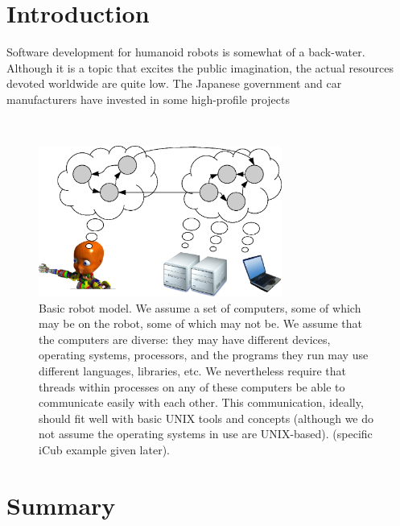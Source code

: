 
\section{Introduction}


Software development for humanoid robots is somewhat of a back-water.
Although it is a topic that excites the public imagination, the
actual resources devoted worldwide are quite low.  The Japanese
government and car manufacturers have invested in some high-profile
projects





\ \\
\newpage


\begin{figure}
\centerline{
\includegraphics[width=8cm]{fig-nethead}
}
\caption{
%
Basic robot model.  We assume a set of computers, some of which may be
on the robot, some of which may not be.  We assume that the computers
are diverse: they may have different devices, operating systems,
processors, and the programs they run may use different languages,
libraries, etc.  We nevertheless require that threads within processes
on any of these computers be able to communicate easily with each other.
This communication, ideally, should fit well with basic UNIX 
tools and concepts (although we do not assume the operating systems
in use are UNIX-based).
%
%
%
(specific iCub example given later).
%
}
\end{figure}

\section{Summary}

